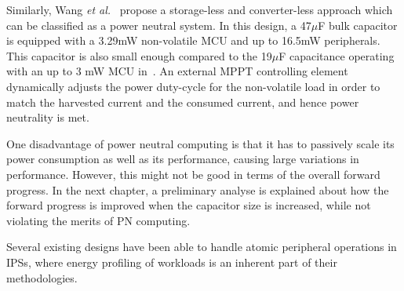 Similarly, Wang \textit{et al.}~\cite{wang2016storage} propose a storage-less and converter-less approach which can be classified as a power neutral system. In this design, a 47$\mu$F bulk capacitor is equipped with a 3.29mW non-volatile MCU and up to 16.5mW peripherals. This capacitor is also small enough compared to the 19$\mu$F capacitance operating with an up to 3 mW MCU in~\cite{balsamo2016graceful}. An external MPPT controlling element dynamically adjusts the power duty-cycle for the non-volatile load in order to match the harvested current and the consumed current, and hence power neutrality is met. 

One disadvantage of power neutral computing is that it has to passively scale its power consumption as well as its performance, causing large variations in performance. However, this might not be good in terms of the overall forward progress. In the next chapter, a preliminary analyse is explained about how the forward progress is improved when the capacitor size is increased, while not violating the merits of PN computing. 




Several existing designs have been able to handle atomic peripheral operations in IPSs, where energy profiling of workloads is an inherent part of their methodologies.

